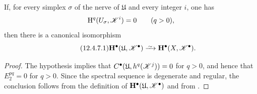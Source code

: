 \begin{corollary}[12.4.7]
\label{0.12.4.7}
If, for every simplex $\sigma$ of the nerve of $\mathfrak{U}$ and
every integer $i$, one has
\[
  \mathrm{H}^q(U_\sigma,\mathscr{K}^i)=0
  \qquad(q>0),
\]
then there is a canonical isomorphism
\begin{equation}
\label{0.12.4.7.1}
\tag{12.4.7.1}
  \bb{H}^\bullet(\mathfrak{U},\sh{K}^\bullet)
  \isoto
  \bb{H}^\bullet(X,\sh{K}^\bullet).
\end{equation}
\end{corollary}

\begin{proof}
The hypothesis implies that
$C^\bullet
(\mathfrak{U},h^q(\mathscr{K}^j))=0$ for $q>0$, and hence that
$E_2^{pq}=0$ for $q>0$.
Since the spectral sequence  is degenerate and
regular, the conclusion follows from the definition
 of
$\mathbf{H}^\bullet(\mathfrak{U},\mathscr{K}^\bullet)$ and from
.
\end{proof}


